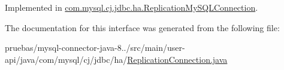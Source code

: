 Implemented in \mbox{\hyperlink{classcom_1_1mysql_1_1cj_1_1jdbc_1_1ha_1_1_replication_my_s_q_l_connection_a8552a17ffb5ad710e46bae3f5aad53f7}{com.\+mysql.\+cj.\+jdbc.\+ha.\+Replication\+My\+S\+Q\+L\+Connection}}.



The documentation for this interface was generated from the following file\+:\begin{DoxyCompactItemize}
\item 
pruebas/mysql-\/connector-\/java-\/8../src/main/user-\/api/java/com/mysql/cj/jdbc/ha/\mbox{\hyperlink{_replication_connection_8java}{Replication\+Connection.\+java}}\end{DoxyCompactItemize}
